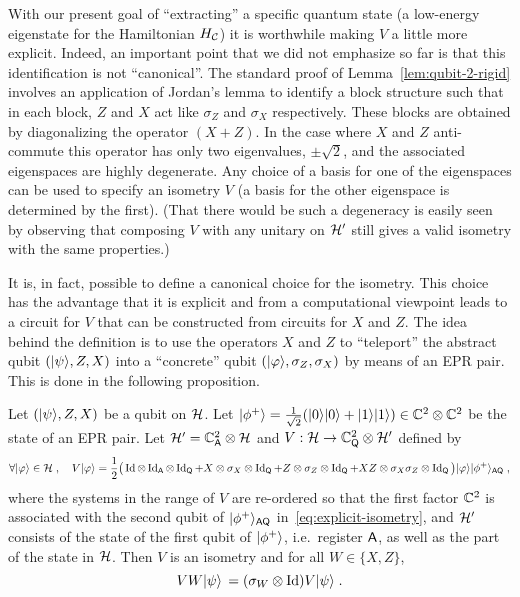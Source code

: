 With our present goal of ``extracting'' a specific quantum state (a low-energy eigenstate for the Hamiltonian $H_{\mathcal{C}}$) it is worthwhile making $V$ a little more explicit. Indeed, an important point that we did not emphasize so far is that this identification is not ``canonical''. The standard proof of Lemma~\ref{lem:qubit-2-rigid} involves an application of Jordan's lemma to identify a block structure such that in each block, $Z$ and $X$ act like $\sigma_Z$ and $\sigma_X$ respectively. These blocks are obtained by diagonalizing the operator $(X+Z)$. In the case where $X$ and $Z$ anti-commute this operator has only two eigenvalues, $\pm\sqrt{2}$, and the associated eigenspaces are highly degenerate. Any choice of a basis for one of the eigenspaces can be used to specify an isometry $V$ (a basis for the other eigenspace is determined by the first). (That there would be such a degeneracy is easily seen by observing that composing $V$ with any unitary on $\mathcal{H}'$ still gives a valid isometry with the same properties.)

It is, in fact, possible to define a canonical choice for the isometry. This choice has the advantage that it is explicit and from a computational viewpoint leads to a circuit for $V$ that can be constructed from circuits for $X$ and $Z$. The idea behind the definition is to use the operators $X$ and $Z$ to ``teleport'' the abstract qubit $(|\psi\rangle,Z,X)$ into a ``concrete'' qubit $(|\varphi\rangle,\sigma_Z,\sigma_X)$ by means of an EPR pair. This is done in the following proposition. 

\begin{proposition}\label{prop:explicit-iso}
Let $(|\psi\rangle,Z,X)$ be a qubit on $\mathcal{H}$. Let $|\phi^+\rangle = \frac{1}{\sqrt{2}} (|0\rangle|0\rangle + |1\rangle|1\rangle)\in \mathbb{C}^2 \otimes \mathbb{C}^2$ be the state of an EPR pair. Let $\mathcal{H}'= \mathbb{C}^2_{\textsf{A}} \otimes \mathcal{H}$ and $V: \mathcal{H} \to \mathbb{C}^2_{\textsf{Q}} \otimes \mathcal{H}'$ defined by
\begin{equation}\label{eq:explicit-isometry}
 \forall |\varphi\rangle \in \mathcal{H}\;,\quad V|\varphi\rangle = \frac{1}{2}\big(\mathop{\rm Id}\nolimits \otimes \mathop{\rm Id}\nolimits_{\textsf{A}}\otimes \mathop{\rm Id}\nolimits_{\textsf{Q}} + X \otimes \sigma_X \otimes \mathop{\rm Id}\nolimits_{\textsf{Q}} + Z \otimes \sigma_Z \otimes \mathop{\rm Id}\nolimits_{\textsf{Q}} + XZ \otimes \sigma_X\sigma_Z \otimes \mathop{\rm Id}\nolimits_{\textsf{Q}}\big) |\varphi\rangle |\phi^+\rangle_{{\textsf{AQ}}}\;,
\end{equation}
where the systems in the range of $V$ are re-ordered so that the first factor $\mathbb{C}^2$ is associated with the second qubit of $|\phi^+\rangle_{{\textsf{AQ}}}$ in~\eqref{eq:explicit-isometry}, and $\mathcal{H}'$ consists of the state of the first qubit of $|\phi^+\rangle$, i.e.\ register ${\textsf{A}}$, as well as the part of the state in $\mathcal{H}$.  
Then $V$ is an isometry and for all $W\in\{X,Z\}$,
\begin{equation}\label{eq:explicit-isometry-2}
VW |\psi\rangle\, = (\sigma_W \otimes \mathop{\rm Id}\nolimits) V |\psi\rangle\;.
\end{equation}
\end{proposition}


